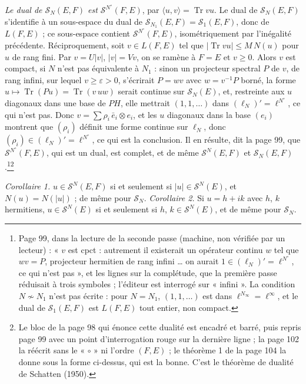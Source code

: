 \documentclass[11pt,a4paper]{article}
\begin{document}
\emph{Le dual de $\mathcal{S}_N(E,F)$ est $\mathcal{S}^{N^{\circ}}(F,E)$}, par
$\langle u, v\rangle = \operatorname{Tr} vu$. Le dual de $\mathcal{S}_N(E,F)$
s'identifie à un sous-espace du dual de $\mathcal{S}_{N_1}(E,F) =
\mathcal{S}_1(E,F)$, donc de $L(F,E)$ ; ce sous-espace contient
$\mathcal{S}^{N^{\circ}}(F,E)$, isométriquement par l'inégalité précédente.
Réciproquement, soit $v \in L(F,E)$ tel que $|\operatorname{Tr} vu| \leq
M\,N(u)$ pour $u$ de rang fini. Par $v = U|v|$, $|v| = Vv$, on se ramène à
$F = E$ et $v \geq 0$. Alors $v$ est compact, si $N$ n'est pas équivalente à
$N_1$ : sinon un projecteur spectral $P$ de $v$, de rang infini, sur lequel
$v \geq \varepsilon > 0$, s'écrirait $P = wv$ avec $w = v^{-1}P$ borné, la
forme $u \mapsto \operatorname{Tr}(Pu) = \operatorname{Tr}(v\,uw)$ serait
continue sur $\mathcal{S}_N(E)$, et, restreinte aux $u$ diagonaux dans une
base de $PH$, elle mettrait $(1, 1, \ldots)$ dans $(\ell_N)' =
\ell^{N^{\circ}}$, ce qui n'est pas. Donc $v = \sum \rho_i\,\bar{e}_i \otimes
e_i$, et les $u$ diagonaux dans la base $(e_i)$ montrent que $(\rho_i)$
définit une forme continue sur $\ell_N$, donc $(\rho_i) \in (\ell_N)' =
\ell^{N^{\circ}}$, ce qui est la conclusion. Il en résulte, dit la page 99,
que $\mathcal{S}^{N^{\circ}}(F,E)$, qui est un dual, est complet, et de même
$\mathcal{S}^N(E,F)$ et $\mathcal{S}_N(E,F)$.\footnote{Page 99, dans la
lecture de la seconde passe (machine, non vérifiée par un lecteur) : « $v$
est cpct : autrement il existerait un opérateur continu $w$ tel que $wv =
P$, projecteur hermitien de rang infini … on aurait $1 \in (\ell_N)' =
\ell^{N^{\circ}}$, ce qui n'est pas », et les lignes sur la complétude, que
la première passe réduisait à trois symboles ; l'éditeur est interrogé sur
« infini ». La condition $N \not\sim N_1$ n'est pas écrite : pour $N =
N_1$, $(1,1,\ldots)$ est dans $\ell^{N_\infty} = \ell^\infty$, et le dual de
$\mathcal{S}_1(E,F)$ est $L(F,E)$ tout entier, non compact.}\footnote{Le bloc de la page 98 qui énonce cette
dualité est encadré et barré, puis repris page 99 avec un point
d'interrogation rouge sur la dernière ligne ; la page 102 la réécrit sans
le « $\circ$ » ni l'ordre $(F,E)$ ; le théorème 1 de la page 104 la donne
sous la forme ci-dessus, qui est la bonne. C'est le théorème de dualité de
Schatten (1950).}

\emph{Corollaire 1.} $u \in \mathcal{S}^N(E,F)$ si et seulement si $|u| \in
\mathcal{S}^N(E)$, et $N(u) = N(|u|)$ ; de même pour $\mathcal{S}_N$.
\emph{Corollaire 2.} Si $u = h + ik$ avec $h$, $k$ hermitiens, $u \in
\mathcal{S}^N(E)$ si et seulement si $h$, $k \in \mathcal{S}^N(E)$, et de
même pour $\mathcal{S}_N$.
\end{document}
